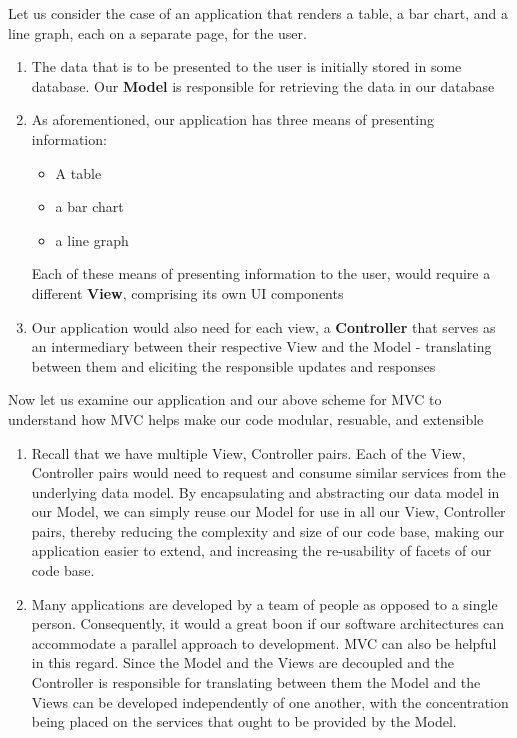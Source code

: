 Let us consider the case of an application that renders a table, a bar chart, and a line graph, each on a separate page, for the user. 


\begin{enumerate}
\item The data that is to be presented to the user is initially stored in some database. Our \textbf{Model} is responsible for retrieving the data in our database

\item As aforementioned, our application has three means of presenting information:
    \begin{itemize}
    \item A table
    \item a bar chart
    \item a line graph
    \end{itemize}
    Each of these means of presenting information to the user, would require a different \textbf{View}, comprising  its own UI components
    
    
\item Our application would also need for each view, a \textbf{Controller} that serves as an intermediary between their respective View and the Model - translating between them and eliciting the responsible updates and responses
\end{enumerate}


Now let us examine our application and our above scheme for MVC to understand how MVC helps make our code modular, resuable, and extensible


\begin{enumerate}
\item Recall that we have multiple View, Controller pairs. Each of the View, Controller pairs would need to request and consume similar services from the underlying data model. By encapsulating and abstracting our data model in our Model, we can simply reuse our Model for use in all our View, Controller pairs, thereby reducing the complexity and size of our code base, making our application easier to extend, and increasing the re-usability of facets of our code base.

\item Many applications are developed by a team of people as opposed to a single person. Consequently, it would a great boon if our software architectures can accommodate a parallel approach to development. MVC can also be helpful in this regard. Since the Model and the Views are decoupled and the Controller is responsible for translating between them the Model and the Views can be developed independently of one another, with the concentration being placed on the services that ought to be provided by the Model.
\end{enumerate}








